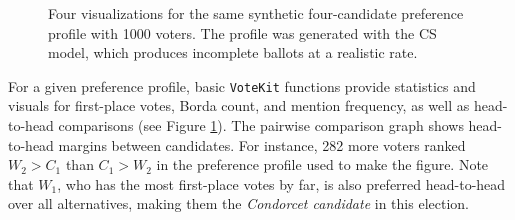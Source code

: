 \documentclass{article}
\newcommand{\VK}{{\tt VoteKit}\xspace}
\begin{document}
\begin{figure}[bht!]

 \caption{Four visualizations for the same synthetic four-candidate preference profile with 1000 voters.  The profile was generated with the CS model, which produces incomplete ballots at a realistic rate.}
 \label{fig: votekit summary stats}
\end{figure}




For a given preference profile, basic \VK functions provide statistics and visuals for first-place votes, Borda count, and mention frequency, as well as head-to-head comparisons (see Figure \ref{fig: votekit summary stats}).   The pairwise comparison graph shows  head-to-head margins between candidates.  For instance, 282 more voters ranked $W_2>C_1$ than $C_1>W_2$ in the preference profile used to make the figure.  Note that $W_1$, who has the most first-place votes by far, is also preferred head-to-head over all alternatives, making them the {\em Condorcet candidate} in this election.
\end{document}
